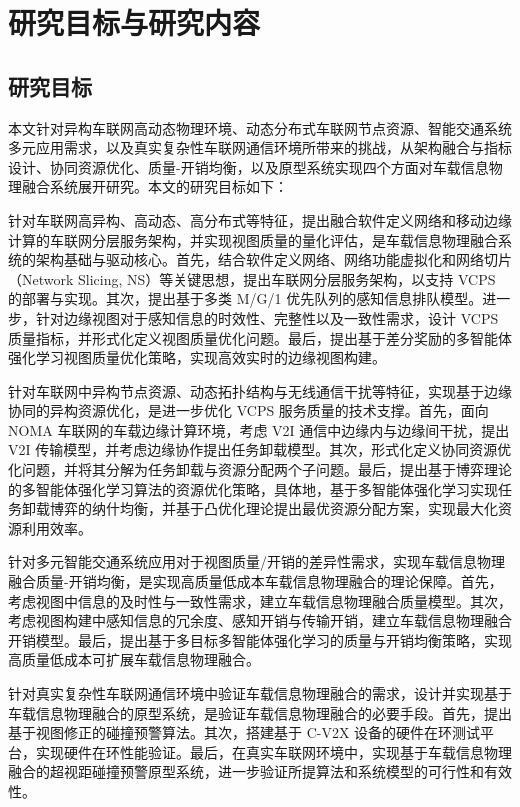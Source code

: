 \section{研究目标与研究内容}\label{section 1-4}

\subsection{研究目标}

本文针对异构车联网高动态物理环境、动态分布式车联网节点资源、智能交通系统多元应用需求，以及真实复杂性车联网通信环境所带来的挑战，从架构融合与指标设计、协同资源优化、质量-开销均衡，以及原型系统实现四个方面对车载信息物理融合系统展开研究。本文的研究目标如下：

 针对车联网高异构、高动态、高分布式等特征，提出融合软件定义网络和移动边缘计算的车联网分层服务架构，并实现视图质量的量化评估，是车载信息物理融合系统的架构基础与驱动核心。首先，结合软件定义网络、网络功能虚拟化和网络切片（Network Slicing, NS）等关键思想，提出车联网分层服务架构，以支持 VCPS 的部署与实现。其次，提出基于多类 M/G/1 优先队列的感知信息排队模型。进一步，针对边缘视图对于感知信息的时效性、完整性以及一致性需求，设计 VCPS 质量指标，并形式化定义视图质量优化问题。最后，提出基于差分奖励的多智能体强化学习视图质量优化策略，实现高效实时的边缘视图构建。

 针对车联网中异构节点资源、动态拓扑结构与无线通信干扰等特征，实现基于边缘协同的异构资源优化，是进一步优化 VCPS 服务质量的技术支撑。首先，面向 NOMA 车联网的车载边缘计算环境，考虑 V2I 通信中边缘内与边缘间干扰，提出 V2I 传输模型，并考虑边缘协作提出任务卸载模型。其次，形式化定义协同资源优化问题，并将其分解为任务卸载与资源分配两个子问题。最后，提出基于博弈理论的多智能体强化学习算法的资源优化策略，具体地，基于多智能体强化学习实现任务卸载博弈的纳什均衡，并基于凸优化理论提出最优资源分配方案，实现最大化资源利用效率。

 针对多元智能交通系统应用对于视图质量/开销的差异性需求，实现车载信息物理融合质量-开销均衡，是实现高质量低成本车载信息物理融合的理论保障。首先，考虑视图中信息的及时性与一致性需求，建立车载信息物理融合质量模型。其次，考虑视图构建中感知信息的冗余度、感知开销与传输开销，建立车载信息物理融合开销模型。最后，提出基于多目标多智能体强化学习的质量与开销均衡策略，实现高质量低成本可扩展车载信息物理融合。

 针对真实复杂性车联网通信环境中验证车载信息物理融合的需求，设计并实现基于车载信息物理融合的原型系统，是验证车载信息物理融合的必要手段。首先，提出基于视图修正的碰撞预警算法。其次，搭建基于 C-V2X 设备的硬件在环测试平台，实现硬件在环性能验证。最后，在真实车联网环境中，实现基于车载信息物理融合的超视距碰撞预警原型系统，进一步验证所提算法和系统模型的可行性和有效性。

